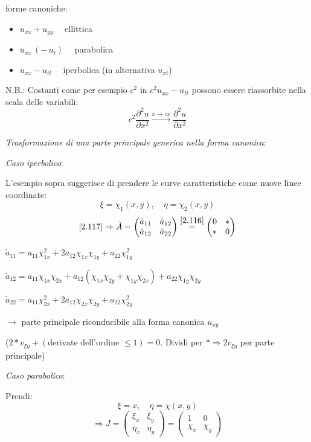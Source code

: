 \documentclass[a4paper,11pt]{report}
\begin{document}
forme canoniche:
\begin{itemize}
\item[] $u_{xx} + u_{yy} \quad$ ellittica
\item[] $u_{xx} \,(-\, u_t) \quad$ parabolica
\item[] $u_{xx} - u_{tt} \quad$ iperbolica (in alternativa $u_{xt}$)
\end{itemize}
N.B.: Costanti come per esempio $c^2$ in $c^2 u_{xx}-u_{tt}$ possono essere riassorbite nella scala delle variabili:
\[
c^2 \frac{\partial^2 u}{\partial x^2} \overset{x\to cx}{\longrightarrow} \frac{\partial^2 u}{\partial x^2}
\]

\emph{Trasformazione di una parte principale generica nella forma canonica}:

\medskip

\emph{Caso iperbolico}:

L'esempio sopra suggerisce di prendere le curve caratteristiche come nuove linee coordinate:
\[
\xi=\chi_1(x,y),\quad \eta=\chi_2(x,y)
\]
\[
\eqref{2.117}\Rightarrow \tilde{A} = \left(\begin{matrix}
\tilde{a}_{11} & \tilde{a}_{12} \\
\tilde{a}_{12} & \tilde{a}_{22}
\end{matrix} \right)\overset{\eqref{2.116}}{=}\left(\begin{matrix}
0 & *\\
* & 0
\end{matrix}\right)
\]

$\tilde{a}_{11}=a_{11}\chi_{1x}^2 + 2a_{12}\chi_{1x}\chi_{1y} + a_{22}\chi_{1y}^2$

$\tilde{a}_{12}=a_{11}\chi_{1x}\chi_{2x} + a_{12}(\chi_{1x}\chi_{2y} + \chi_{1y}\chi_{2x}) + a_{22}\chi_{1y}\chi_{2y}$

$\tilde{a}_{22}=a_{11}\chi_{2x}^2 + 2a_{12}\chi_{2x}\chi_{2y} + a_{22}\chi_{2y}^2$

$\rightarrow$ parte principale riconducibile alla forma canonica $u_{xy}$ 

($2 * v_{\xi\eta} + (\text{derivate dell'ordine }\leq1) =0$. Dividi per $* \Rightarrow 2v_{\xi \eta}$ per parte principale)

\medskip

\emph{Caso parabolico}:

Prendi:
\[
\xi=x, \quad \eta=\chi(x,y)
\]
\[
\Rightarrow J=\left(\begin{matrix}
\xi_x & \xi_y \\
\eta_x & \eta_y
\end{matrix}\right)=\left( \begin{matrix}
1 & 0\\
\chi_{x} & \chi_y
\end{matrix}\right)
\]
\end{document}
